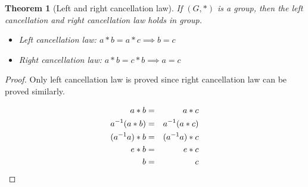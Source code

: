 \documentclass{article}
\theoremstyle{MyNonumberplain}
\theoremstyle{break}
\newtheorem*{proof}{Proof. }
\theoremstyle{break}
\newtheorem{theorem}{Theorem}[section]
\theoremstyle{break}
\theoremstyle{definition}
\theoremstyle{break}
\begin{document}
\begin{thmbox}
    \begin{theorem}[Left and right cancellation law]
        If $(G, \ast)$ is a group, then the left cancellation and right cancellation law holds in group.\bigskip
        \begin{itemize}
            \item Left cancellation law: $a*b=a*c\implies b=c$
            \item Right cancellation law: $a*b=c*b\implies a=c$
        \end{itemize}
    \end{theorem}
    \begin{prfbox}
        \begin{proof}
            Only left cancellation law is proved since right cancellation law can be proved similarly.
    
            \begin{eqnarray}
                a \ast b & = & a \ast c\nonumber\\
                a^{- 1} (a \ast b) & = & a^{- 1} (a \ast c)\nonumber\\
                (a^{- 1} a) \ast b & = & (a^{- 1} a) \ast c \hspace*{\fill}
                \nonumber\\
                e \ast b & = & e \ast c \hspace*{\fill} \nonumber\\
                b & = & c \hspace*{\fill}  \nonumber
              \end{eqnarray}
        \end{proof}
    \end{prfbox}
    
\end{thmbox}
\end{document}
